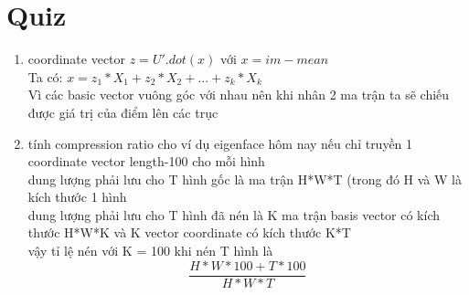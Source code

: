 \documentclass[12pt,letterpaper]{article}
\begin{document}
\section*{Quiz}
\begin{enumerate}
    \item coordinate vector $z = U'.dot(x)$ với $ x = im - mean $ 
    \\ Ta có: 
    $x = z_1*X_1 + z_2*X_2 + ... + z_k*X_k$
    \\ Vì các basic vector vuông góc với nhau nên khi nhân 2 ma trận ta sẽ chiếu được giá trị của điểm lên các trục
    \item tính compression ratio cho ví dụ eigenface hôm nay nếu chỉ truyền 1 coordinate vector length-100 cho mỗi hình
    \\ dung lượng phải lưu cho T hình gốc là ma trận H*W*T (trong đó H và W là kích thước 1 hình
    \\ dung lượng phải lưu cho T hình đã nén là K ma trận basis vector có kích thước H*W*K và K vector coordinate có kích thước K*T
    \\ vậy tỉ lệ nén với K = 100 khi nén T hình là 
    $$ 
        \frac{H*W*100 + T*100}{H*W*T}
    $$
\end{enumerate}
\end{document}
